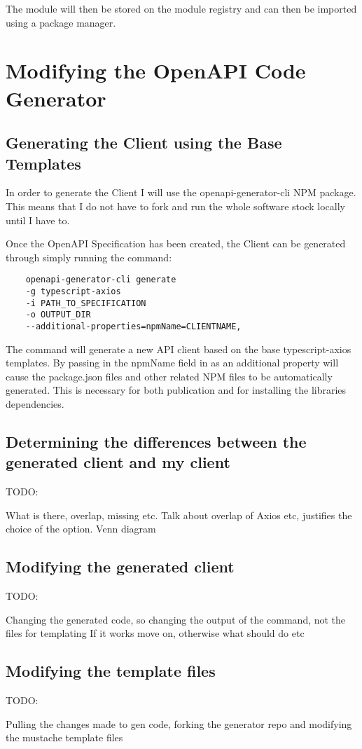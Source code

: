     The module will then be stored on the module registry and can then be imported using a package manager. 
    
\section{Modifying the OpenAPI Code Generator}
\subsection{Generating the Client using the Base Templates}
In order to generate the Client I will use the openapi-generator-cli NPM package. This means that I do not have to fork and run the whole software stock locally until I have to.

Once the OpenAPI Specification has been created, the Client can be generated through simply running the command:
\begin{verbatim}
    openapi-generator-cli generate 
    -g typescript-axios 
    -i PATH_TO_SPECIFICATION
    -o OUTPUT_DIR
    --additional-properties=npmName=CLIENTNAME,
\end{verbatim}
The command will generate a new API client based on the base typescript-axios templates. By passing in the npmName field in as an additional property will cause the package.json files and other related NPM files to be automatically generated. This is necessary for both publication and for installing the libraries dependencies.
\subsection{Determining the differences between the generated client and my client}
TODO:

What is there, overlap, missing etc. Talk about overlap of Axios etc, justifies the choice of the option.
Venn diagram
\subsection{Modifying the generated client}
TODO:

Changing the generated code, so changing the output of the command, not the files for templating
If it works move on, otherwise what should do etc
\subsection{Modifying the template files}
TODO:

Pulling the changes made to gen code, forking the generator repo and modifying the mustache template files